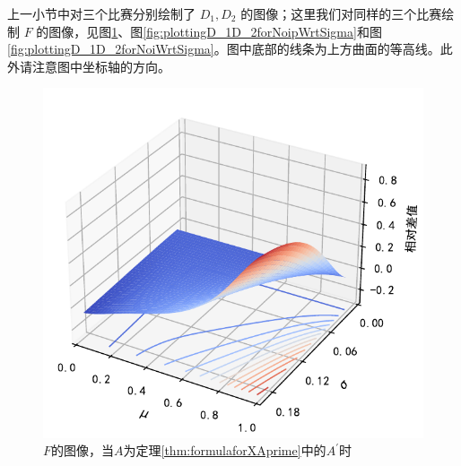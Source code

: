             \vspace{1.5ex}

            上一小节中对三个比赛分别绘制了 $D_1,D_2$ 的图像；这里我们对同样的三个比赛绘制 $F$ 的图像，见图\ref{fig:plottingD_1D_2forAprimeWrtSigma}、图\ref{fig:plottingD_1D_2forNoipWrtSigma}和图\ref{fig:plottingD_1D_2forNoiWrtSigma}。图中底部的线条为上方曲面的等高线。此外请注意图中坐标轴的方向。

            \begin{figure}[p]
                \centering
                \includegraphics[width=\textwidth]{fig/plottingD_1D_2WrtSigma.pdf}
                \caption{$F$的图像，当$A$为定理\ref{thm:formulaforXAprime}中的$A^\prime$时}
                \label{fig:plottingD_1D_2forAprimeWrtSigma}
            \end{figure}

